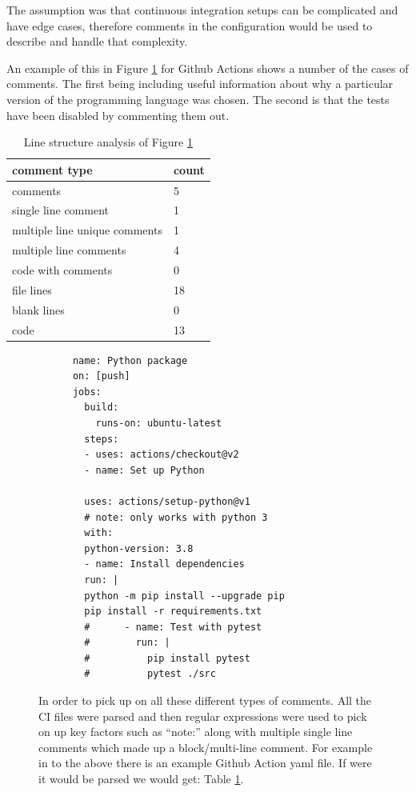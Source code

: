 \documentclass[10pt,conference]{IEEEtran}
\begin{document}
The assumption was that continuous integration setups can be complicated and have edge cases, therefore comments in the configuration would be used to describe and handle that complexity.

An example of this in Figure \ref{fig:example_configuration_file} for Github Actions shows a number of the cases of comments. The first being including useful information about why a particular version of the programming language was chosen. The second is that the tests have been disabled by commenting them out. 

\begin{table}[!b]
  \begin{tabular}{|l|l|}
    \hline
    \textbf{comment type} & \textbf{count} \\ \hline
    comments & 5 \\ \hline
    single line comment & 1 \\ \hline
    multiple line unique comments & 1 \\ \hline
    multiple line comments  & 4 \\ \hline
    code with comments & 0 \\ \hline
    file lines & 18 \\ \hline
    blank lines & 0 \\ \hline
    code & 13 \\ \hline
  \end{tabular}
  \caption{Line structure analysis of Figure \ref{fig:example_configuration_file}}
  \label{table:example_structure_data}
\end{table}

\begin{figure}[!ht]
    
    \begin{verbatim}
      name: Python package
      on: [push]
      jobs:
        build:
          runs-on: ubuntu-latest
        steps:
        - uses: actions/checkout@v2
        - name: Set up Python
        
        uses: actions/setup-python@v1
        # note: only works with python 3
        with:
        python-version: 3.8
        - name: Install dependencies
        run: |
        python -m pip install --upgrade pip
        pip install -r requirements.txt
        #      - name: Test with pytest
        #        run: |
        #          pip install pytest
        #          pytest ./src
    \end{verbatim}
    \caption{In order to pick up on all these different types of comments. All the CI files were parsed and then regular expressions were used to pick on up key factors such as \enquote{note:} along with multiple single line comments which made up a block/multi-line comment. For example in to the above there is an example Github Action yaml file. If were it would be parsed we would get: Table \ref{table:example_structure_data}.}
    \label{fig:example_configuration_file}
\end{figure}
\end{document}
